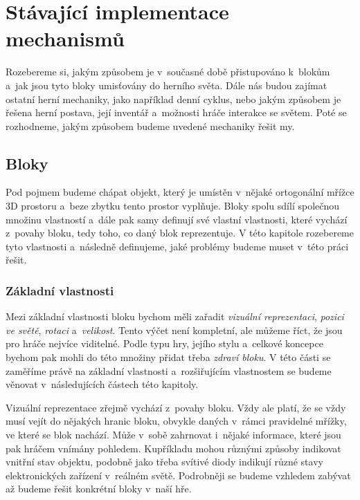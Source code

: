 

\section{Stávající implementace mechanismů}

Rozebereme si, jakým způsobem je v~současné době přistupováno k~blokům a~jak jsou tyto bloky umisťovány do herního světa. Dále nás budou zajímat ostatní herní mechaniky, jako například denní cyklus, nebo jakým způsobem je řešena herní postava, její inventář a~možnosti hráče interakce se světem. Poté se rozhodneme, jakým způsobem budeme uvedené mechaniky řešit my.

\subsection{Bloky}
\label{subsec:blocks}

Pod pojmem  budeme chápat objekt, který je umístěn v~nějaké ortogonální mřížce 3D prostoru a~beze zbytku tento prostor vyplňuje. Bloky spolu sdílí společnou množinu vlastností a~dále pak samy definují své vlastní vlastnosti, které vychází z~povahy bloku, tedy toho, co daný blok reprezentuje. V této kapitole rozebereme tyto vlastnosti a~následně definujeme, jaké problémy budeme muset v~této práci řešit.


\subsubsection{Základní vlastnosti}

Mezi základní vlastnosti bloku bychom měli zařadit \textit{vizuální reprezentaci}, \textit{pozici ve světě}, \textit{rotaci} a~\textit{velikost}. Tento výčet není kompletní, ale můžeme říct, že jsou pro hráče nejvíce viditelné. Podle typu hry, jejího stylu a~celkové koncepce bychom pak mohli do této množiny přidat třeba \textit{zdraví bloku}. V této části se zaměříme právě na základní vlastnosti a~rozšiřujícím vlastnostem se budeme věnovat v~následujících částech této kapitoly.

Vizuální reprezentace zřejmě vychází z~povahy bloku. Vždy ale platí, že se vždy musí vejít do nějakých hranic bloku, obvykle daných v~rámci pravidelné mřížky, ve které se blok nachází. Může v~sobě zahrnovat i~nějaké informace, které jsou pak hráčem vnímány pohledem. Kupříkladu mohou různými způsoby indikovat vnitřní stav objektu, podobně jako třeba svítivé diody indikují různé stavy elektronických zařízení v~reálném světě. Podrobněji se budeme vzhledem zabývat až budeme řešit konkrétní bloky v~naší hře.

